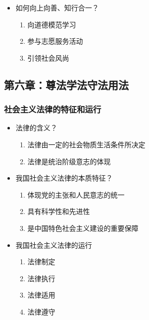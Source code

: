 \begin{itemize}
\tightlist
\item
  如何向上向善、知行合一？

  \begin{enumerate}
  \def\labelenumi{\arabic{enumi}.}
  \tightlist
  \item
    向道德模范学习
  \item
    参与志愿服务活动
  \item
    引领社会风尚
  \end{enumerate}
\end{itemize}

\hypertarget{ux7b2cux516dux7ae0ux5c0aux6cd5ux5b66ux6cd5ux5b88ux6cd5ux7528ux6cd5}{%
\subsection{第六章：尊法学法守法用法}\label{ux7b2cux516dux7ae0ux5c0aux6cd5ux5b66ux6cd5ux5b88ux6cd5ux7528ux6cd5}}

\hypertarget{ux793eux4f1aux4e3bux4e49ux6cd5ux5f8bux7684ux7279ux5f81ux548cux8fd0ux884c}{%
\subsubsection{社会主义法律的特征和运行}\label{ux793eux4f1aux4e3bux4e49ux6cd5ux5f8bux7684ux7279ux5f81ux548cux8fd0ux884c}}

\begin{itemize}
\tightlist
\item
  法律的含义？

  \begin{enumerate}
  \def\labelenumi{\arabic{enumi}.}
  \tightlist
  \item
    法律由一定的社会物质生活条件所决定
  \item
    法律是统治阶级意志的体现
  \end{enumerate}
\item
  我国社会主义法律的本质特征？

  \begin{enumerate}
  \def\labelenumi{\arabic{enumi}.}
  \tightlist
  \item
    体现党的主张和人民意志的统一
  \item
    具有科学性和先进性
  \item
    是中国特色社会主义建设的重要保障
  \end{enumerate}
\item
  我国社会主义法律的运行

  \begin{enumerate}
  \def\labelenumi{\arabic{enumi}.}
  \tightlist
  \item
    法律制定
  \item
    法律执行
  \item
    法律适用
  \item
    法律遵守
  \end{enumerate}
\end{itemize}

